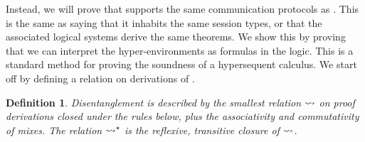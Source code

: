 \documentclass[submission,copyright,creativecommons]{eptcs}
\newtheorem{definition}[lemma]{Definition}
\begin{document}
Instead, we will prove that \hcp supports the same communication protocols as \cp. This is the same as saying that it inhabits the same session types, or that the associated logical systems derive the same theorems. We show this by proving that we can interpret the hyper-environments as formulas in the logic. This is a standard method for proving the soundness of a hypersequent calculus. We start off by defining a relation on derivations of \hcp.
\begin{definition}\label{def:hcp-gk}
  Disentanglement is described by the smallest relation $\leadsto$ on proof derivations closed under the rules below, plus the associativity and commutativity of mixes. The relation $\leadsto^\star$ is the reflexive, transitive closure of $\leadsto$.
  \begin{center}
\end{center}
\end{definition}
\end{document}
